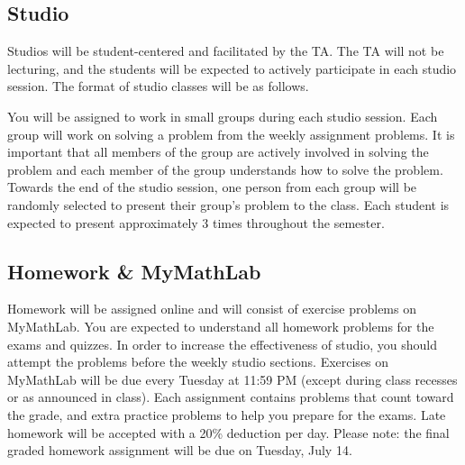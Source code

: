 \documentclass[11pt]{article}
\begin{document}
    \subsection{Studio}
    
    Studios will be student-centered and facilitated by the TA. The TA will not be lecturing, and the students will be expected to actively participate in each studio session. The format of studio classes will be as follows.
    
    You will be assigned to work in small groups during each studio session. Each group will work on solving a problem from the weekly assignment problems. It is important that all members of the group are actively involved in solving the problem and each member of the group understands how to solve the problem. Towards the end of the studio session, one person from each group will be randomly selected to present their group's problem to the class. Each student is expected to present approximately 3 times throughout the semester.  
    
        
    
    


    \subsection{Homework \& MyMathLab}
    \label{sec:MML}
        
    Homework will be assigned online and will consist of exercise problems on MyMathLab. You are expected to understand all homework problems for the exams and quizzes. In order to increase the effectiveness of studio, you should attempt the problems before the weekly studio sections. Exercises on MyMathLab will be due every Tuesday at 11:59 PM (except during class recesses or as announced in class).   Each assignment contains problems that count toward the grade, and extra practice problems to help you prepare for the exams.  Late homework will be accepted with a 20\% deduction per day.  Please note: the final graded homework assignment will be due on Tuesday, July 14.
    
\end{document}
